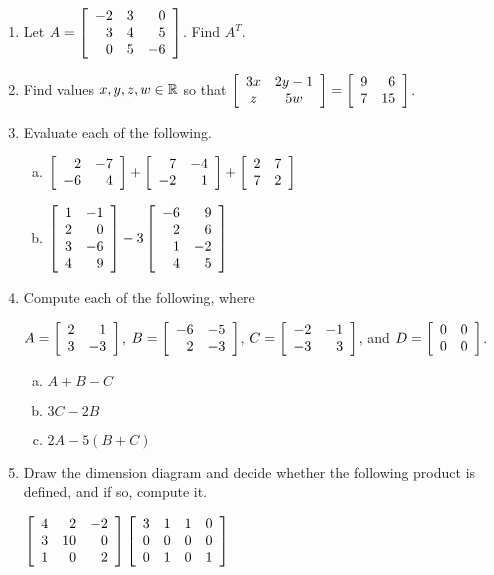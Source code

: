 \documentclass[11pt]{exam}
\begin{document}
\begin{enumerate}
\item Let $A = \MATRIX{rrr}{-2 & 3 & 0\\3 & 4 & 5\\0 & 5 & -6}$.  Find $A^{T}$.

\item Find values $x,y,z,w\in\REAL$ so that $\MATRIX{cc}{3x & 2y - 1\\z & 5w} = \MATRIX{rr}{9 & 6\\7 & 15}$.

\item Evaluate each of the following.
\begin{enumerate}[(a)]
\item $\MATRIX{rr}{2 & -7\\-6 & 4} + \MATRIX{rr}{7 & -4\\-2 & 1} + \MATRIX{rr}{2 & 7\\7 & 2}$
\item $\MATRIX{rr}{1 & -1\\2 & 0\\3 & -6\\4 & 9} - 3\MATRIX{rr}{-6 & 9\\2 & 6\\1 & -2\\4 & 5}$
\end{enumerate}

\item Compute each of the following, where
\begin{center}
$A = \MATRIX{rr}{2 & 1\\3 & -3}$,\hspace{0.5cm} $B = \MATRIX{rr}{-6 & -5\\2 & -3}$,\hspace{0.5cm} $C = \MATRIX{rr}{-2 & -1\\-3 & 3}$,\hspace{0.5cm} and $D = \MATRIX{rr}{0 & 0\\0 & 0}$.
\end{center}
\begin{enumerate}[(a)]
\item $A + B - C$
\item $3C - 2B$
\item $2A - 5(B + C)$
\end{enumerate}
\newpage

\item Draw the dimension diagram and decide whether the following product is defined, and if so, compute it.
\begin{center}
$\MATRIX{rrr}{4 & 2 & -2\\3 & 10 & 0\\1 & 0 & 2}\MATRIX{rrrr}{3 & 1 & 1 & 0\\0 & 0 & 0 & 0\\0 & 1 & 0 & 1}$
\end{center}


\end{enumerate}
\end{document}
